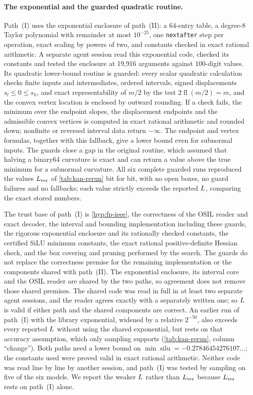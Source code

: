 \paragraph{The exponential and the guarded quadratic routine.}
Path~(I) uses the exponential enclosure of path~(II): a 64-entry table, a degree-8 Taylor polynomial with remainder at most $10^{-25}$, one \texttt{nextafter} step per operation, exact scaling by powers of two, and constants checked in exact rational arithmetic.
A separate agent session read this exponential code, checked its constants and tested the enclosure at 19,916 arguments against 100-digit values.
Its quadratic lower-bound routine is guarded: every scalar quadratic calculation checks finite inputs and intermediates, ordered intervals, signed displacements $s_l\le0\le s_h$, and exact representability of $m/2$ by the test $2\operatorname{fl}(m/2)=m$, and the convex vertex location is enclosed by outward rounding.
If a check fails, the minimum over the endpoint slopes, the displacement endpoints and the admissible convex vertices is computed in exact rational arithmetic and rounded down; nonfinite or reversed interval data return $-\infty$.
The endpoint and vertex formulas, together with this fallback, give a lower bound even for subnormal inputs.
The guards close a gap in the original routine, which assumed that halving a binary64 curvature is exact and can return a value above the true minimum for a subnormal curvature.
All six complete guarded runs reproduced the values $L_{\mathrm{ver}}$ of \cref{tab:kan-rerun} bit for bit, with no open boxes, no guard failures and no fallbacks; each value strictly exceeds the reported $L$, comparing the exact stored numbers.

The trust base of path~(I) is \cref{hyp:fp-ieee}, the correctness of the OSIL reader and exact decoder, the interval and bounding implementation including these guards, the rigorous exponential enclosure and its rationally checked constants, the certified SiLU minimum constants, the exact rational positive-definite Hessian check, and the box covering and pruning performed by the search.
The guards do not replace the correctness premise for the remaining implementation or the components shared with path~(II).
The exponential enclosure, its interval core and the OSIL reader are shared by the two paths, so agreement does not remove those shared premises.
The shared code was read in full in at least two separate agent sessions, and the reader agrees exactly with a separately written one; so $L$ is valid if either path and the shared components are correct.
An earlier run of path~(I) with the library exponential, widened by a relative $2^{-50}$, also exceeds every reported $L$ without using the shared exponential, but rests on that accuracy assumption, which only sampling supports (\cref{tab:kan-rerun}, column ``change'').
Both paths need a lower bound on $\min\operatorname{silu}=-0.27846454276107\ldots$; the constants used were proved valid in exact rational arithmetic.
Neither code was read line by line by another session, and path~(I) was tested by sampling on five of the six models.
We report the weaker $L$ rather than $L_{\mathrm{ver}}$ because $L_{\mathrm{ver}}$ rests on path~(I) alone.

